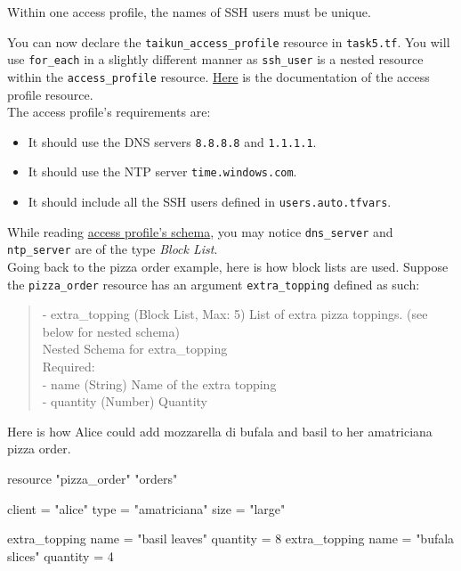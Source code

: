 \begin{warn}
Within one access profile, the names of SSH users must be unique.
\end{warn}

You can now declare the \texttt{taikun\_access\_profile} resource in \texttt{task5.tf}.
You will use \texttt{for\_each} in a slightly different manner as \texttt{ssh\_user} is a nested resource
within the \texttt{access\_profile} resource.
\href{https://registry.terraform.io/providers/itera-io/taikun/latest/docs/resources/access_profile}{Here}
is the documentation of the access profile resource.\\

The access profile's requirements are:
\begin{itemize}
  \item It should use the DNS servers \texttt{8.8.8.8} and \texttt{1.1.1.1}.
  \item It should use the NTP server \texttt{time.windows.com}.
  \item It should include all the SSH users defined in \texttt{users.auto.tfvars}.
\end{itemize}

\begin{tip}
While reading \href{https://registry.terraform.io/providers/itera-io/taikun/latest/docs/resources/access_profile#schema}{access profile's schema},
you may notice \texttt{dns\_server} and \texttt{ntp\_server} are of the type \textit{Block List}.\\

Going back to the pizza order example, here is how block lists are used.
Suppose the \texttt{pizza\_order} resource has an argument \texttt{extra\_topping} defined as such:
\begin{quote}
- extra\_topping (Block List, Max: 5) List of extra pizza toppings. (see below for nested schema)\\

Nested Schema for extra\_topping\\
Required:\\
- name (String) Name of the extra topping\\
- quantity (Number) Quantity
\end{quote}
Here is how Alice could add mozzarella di bufala and basil to her amatriciana pizza order.
\begin{tf}
resource "pizza_order" "orders" {
  client = "alice"
  type   = "amatriciana"
  size   = "large"

  extra_topping {
    name = "basil leaves"
    quantity = 8
  }
  extra_topping {
    name = "bufala slices"
    quantity = 4
  }
}
\end{tf}
\end{tip}
\pagebreak


